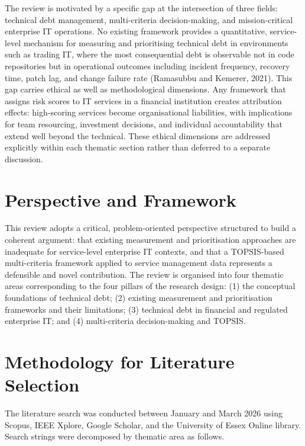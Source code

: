 \documentclass[
  british,
  12pt,
  a4paper,
]{report}
\begin{document}
The review is motivated by a specific gap at the intersection of three
fields: technical debt management, multi-criteria decision-making, and
mission-critical enterprise IT operations. No existing framework
provides a quantitative, service-level mechanism for measuring and
prioritising technical debt in environments such as trading IT, where
the most consequential debt is observable not in code repositories but
in operational outcomes including incident frequency, recovery time,
patch lag, and change failure rate (Ramasubbu and Kemerer, 2021). This
gap carries ethical as well as methodological dimensions. Any framework
that assigns risk scores to IT services in a financial institution
creates attribution effects: high-scoring services become organisational
liabilities, with implications for team resourcing, investment
decisions, and individual accountability that extend well beyond the
technical. These ethical dimensions are addressed explicitly within each
thematic section rather than deferred to a separate discussion.

\section{Perspective and Framework}\label{perspective-and-framework}

This review adopts a critical, problem-oriented perspective structured
to build a coherent argument: that existing measurement and
prioritisation approaches are inadequate for service-level enterprise IT
contexts, and that a TOPSIS-based multi-criteria framework applied to
service management data represents a defensible and novel contribution.
The review is organised into four thematic areas corresponding to the
four pillars of the research design: (1) the conceptual foundations of
technical debt; (2) existing measurement and prioritisation frameworks
and their limitations; (3) technical debt in financial and regulated
enterprise IT; and (4) multi-criteria decision-making and TOPSIS.

\section{Methodology for Literature
Selection}\label{methodology-for-literature-selection}

The literature search was conducted between January and March 2026 using
Scopus, IEEE Xplore, Google Scholar, and the University of Essex Online
library. Search strings were decomposed by thematic area as follows.
\end{document}
